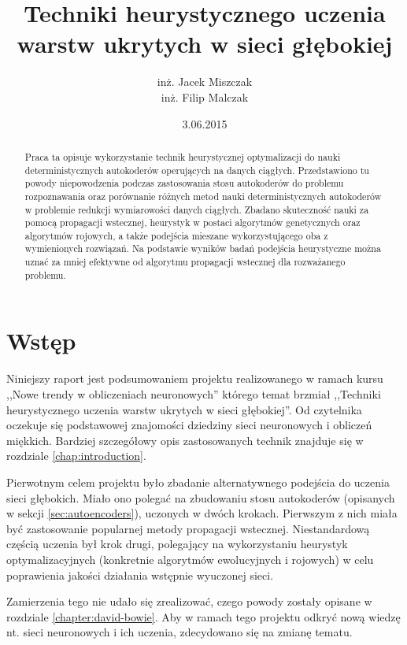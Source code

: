 \documentclass[11pt,a4paper,oneside]{report}
\begin{document}
\title{Techniki heurystycznego uczenia warstw ukrytych w sieci głębokiej}
\author{inż. Jacek Miszczak \\ inż. Filip Malczak}
\date{3.06.2015}
\maketitle

\begin{abstract}
Praca ta opisuje wykorzystanie technik heurystycznej optymalizacji do nauki deterministycznych autokoderów operujących na danych ciągłych. Przedstawiono tu powody niepowodzenia podczas zastosowania stosu autokoderów do problemu rozpoznawania oraz porównanie różnych metod nauki deterministycznych autokoderów w problemie redukcji wymiarowości danych ciągłych. Zbadano skuteczność nauki za pomocą propagacji wstecznej, heurystyk w postaci algorytmów genetycznych oraz algorytmów rojowych, a także podejścia mieszane wykorzystującego oba z wymienionych rozwiązań. Na podstawie wyników badań podejścia heurystyczne można uznać za mniej efektywne od algorytmu propagacji wstecznej dla rozważanego problemu.

\end{abstract}

\tableofcontents

\chapter{Wstęp}

Niniejszy raport jest podsumowaniem projektu realizowanego w ramach kursu ,,Nowe trendy w obliczeniach neuronowych'' którego temat brzmiał ,,Techniki heurystycznego uczenia warstw ukrytych w sieci głębokiej''. Od czytelnika oczekuje się podstawowej znajomości dziedziny sieci neuronowych i obliczeń miękkich. Bardziej szczegółowy opis zastosowanych technik znajduje się w rozdziale \ref{chap:introduction}.

Pierwotnym celem projektu było zbadanie alternatywnego podejścia do uczenia sieci głębokich. Miało ono polegać na zbudowaniu stosu autokoderów (opisanych w sekcji \ref{sec:autoencoders}), uczonych w dwóch krokach. Pierwszym z nich miała być zastosowanie popularnej metody propagacji wstecznej. Niestandardową częścią uczenia był krok drugi, polegający na wykorzystaniu heurystyk optymalizacyjnych (konkretnie algorytmów ewolucyjnych i rojowych) w celu poprawienia jakości działania wstępnie wyuczonej sieci.

Zamierzenia tego nie udało się zrealizować, czego powody zostały opisane w rozdziale \ref{chapter:david-bowie}. Aby w ramach tego projektu odkryć nową wiedzę nt. sieci neuronowych i ich uczenia, zdecydowano się na zmianę tematu.
\end{document}
